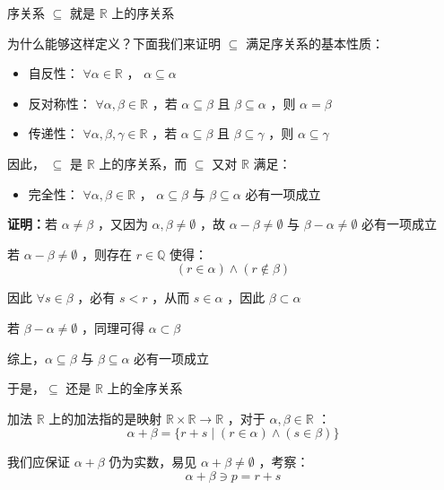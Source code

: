 \begin{definition}{序关系}
$\subseteq$ 就是 $\mathbb{R}$ 上的序关系
\end{definition}
为什么能够这样定义？下面我们来证明 $\subseteq$  满足序关系的基本性质：
\begin{itemize}
\item 自反性： $\forall \alpha\in\mathbb{R}$ ， $\alpha\subseteq\alpha$
\end{itemize}
\begin{itemize}
\item 
反对称性： $\forall \alpha,\beta\in\mathbb{R}$ ，若 $\alpha\subseteq\beta$ 且 $\beta\subseteq\alpha$ ，则 $\alpha=\beta$ 
\end{itemize}
\begin{itemize}
\item 传递性： $\forall \alpha,\beta,\gamma \in \mathbb{R}$ ，若 $\alpha\subseteq\beta$ 且 $\beta\subseteq\gamma$ ，则 $\alpha\subseteq\gamma$ 
\end{itemize}

因此， $\subseteq$ 是 $\mathbb{R}$ 上的序关系，而 $\subseteq$ 又对 $\mathbb{R}$ 满足：

\begin{itemize}
\item 完全性： $\forall \alpha,\beta \in\mathbb{R}$ ， $\alpha\subseteq \beta$  与 $\beta\subseteq \alpha$  必有一项成立
\end{itemize}

\textbf{证明：}若 $\alpha\neq\beta$ ，又因为 $\alpha,\beta\neq\emptyset$ ，故 $\alpha-\beta\neq \emptyset$ 与 $\beta-\alpha \neq \emptyset$ 必有一项成立

若 $\alpha-\beta\neq\emptyset$ ，则存在 $r\in\mathbb{Q}$ 使得：
$$(r\in\alpha)\wedge (r\notin\beta)$$

因此 $\forall s\in\beta$ ，必有 $s<r$ ，从而 $s\in\alpha$ ，因此 $\beta\subset \alpha$

若 $\beta-\alpha\neq\emptyset$ ，同理可得 $\alpha\subset \beta$

综上，$\alpha\subseteq \beta$   与 $\beta\subseteq \alpha$  必有一项成立

于是，$\subseteq$ 还是 $\mathbb{R}$ 上的全序关系



\begin{definition}{加法}
$\mathbb{R}$ 上的加法指的是映射 $\mathbb{R}\times\mathbb{R}\to\mathbb{R}$ ，对于 $\alpha,\beta\in\mathbb{R}$ ：
$$\alpha+\beta=\{r+s\mid(r\in\alpha)\wedge(s\in\beta)\}$$ 
\end{definition}
我们应保证 $\alpha+\beta$ 仍为实数，易见 $\alpha+\beta\neq \emptyset$ ，考察：
$$\alpha+\beta\ni p=r+s$$


